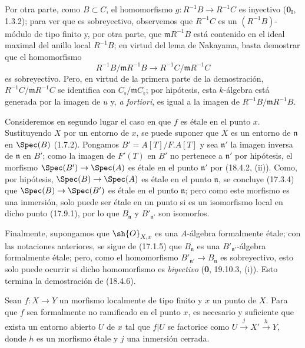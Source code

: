 Por otra parte, como $B\subset C$, el homomorfismo $g:R^{-1}B\to R^{-1}C$ es inyectivo ($\mathbf 0_{\mathrm I}$, 1.3.2); para ver que es sobreyectivo, observemos que $R^{-1}C$ es un $(R^{-1}B)$-módulo de tipo finito y, por otra parte, que $\mathfrak mR^{-1}B$ está contenido en el ideal maximal del anillo local $R^{-1}B$; en virtud del lema de Nakayama, basta demostrar que el homomorfismo
\[
  R^{-1}B/\mathfrak mR^{-1}B\longrightarrow R^{-1}C/\mathfrak mR^{-1}C
\]
es sobreyectivo. Pero, en virtud de la primera parte de la demostración, $R^{-1}C/\mathfrak mR^{-1}C$ se identifica con $C_{\mathfrak r}/\mathfrak mC_{\mathfrak r}$; por hipótesis, esta $k$-álgebra está generada por la imagen de $u$ y, \emph{a fortiori}, es igual a la imagen de $R^{-1}B/\mathfrak mR^{-1}B$.

Consideremos en segundo lugar el caso en que $f$ es étale en el punto $x$. Sustituyendo $X$ por un entorno de $x$, se puede suponer que $X$ es un entorno de $\mathfrak n$ en $\Spec(B)$ (1.7.2). Pongamos $B'=A[T]/F.A[T]$ y sea $\mathfrak n'$ la imagen inversa de $\mathfrak n$ en $B'$; como la imagen de $F'(T)$ en $B'$ no pertenece a $\mathfrak n'$ por hipótesis, el morfismo $\Spec(B')\to\Spec(A)$ es étale en el punto $\mathfrak n'$ por (18.4.2, (ii)). Como, por hipótesis, $\Spec(B)\to\Spec(A)$ es étale en el punto $\mathfrak n$, se concluye (17.3.4) que $\Spec(B)\to\Spec(B')$ es étale en el punto $\mathfrak n$; pero como este morfismo es una inmersión, solo puede ser étale en un punto si es un isomorfismo local en dicho punto (17.9.1), por lo que $B_{\mathfrak n}$ y $B'_{\mathfrak n'}$ son isomorfos.

Finalmente, supongamos que $\sh{O}_{X,x}$ es una $A$-álgebra formalmente étale; con las notaciones anteriores, se sigue de (17.1.5) que $B_{\mathfrak n}$ es una $B'_{\mathfrak n'}$-álgebra formalmente étale; pero, como el homomorfismo $B'_{\mathfrak n'}\to B_{\mathfrak n}$ es sobreyectivo, esto solo puede ocurrir si dicho homomorfismo es \emph{biyectivo} (\textbf 0, 19.10.3, (i)). Esto termina la demostración de (18.4.6).

\begin{corollary}[18.4.7]
\label{IV.18.4.7}
Sean $f:X\to Y$ un morfismo localmente de tipo finito y $x$ un punto de $X$. Para que $f$ sea formalmente no ramificado en el punto $x$, es necesario y suficiente que exista un entorno abierto $U$ de $x$ tal que $f|U$ se factorice como $U\xrightarrow{j}X'\xrightarrow{h}Y$, donde $h$ es un morfismo étale y $j$ una inmersión cerrada.
\end{corollary}

